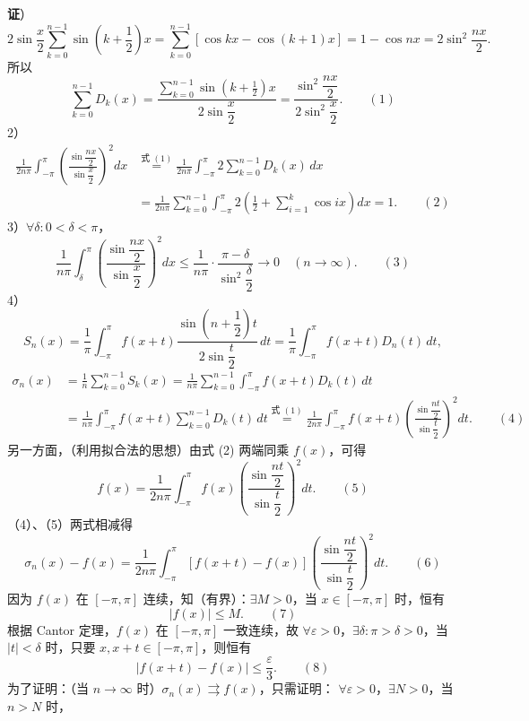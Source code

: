 \documentclass[UTF8,12pt,a4paper,fontset=fandol]{ctexart}
\providecommand{\xlongequal}[1]{\stackrel{#1}{=}}
\begin{document}
\noindent\textbf{证}）
\[
  2\sin\frac x2\sum_{k=0}^{n-1}\sin\left(k+\frac12\right)x
  =\sum_{k=0}^{n-1}[\cos kx-\cos(k+1)x]
  =1-\cos nx=2\sin^2\frac{nx}{2}.
\]
所以
\[
  \sum_{k=0}^{n-1}D_k(x)
  =\frac{\displaystyle\sum_{k=0}^{n-1}\sin\left(k+\frac12\right)x}{2\sin\dfrac x2}
  =\frac{\sin^2\dfrac{nx}{2}}{2\sin^2\dfrac x2}. \qquad(1)
\]
2）
\[
\begin{aligned}
\frac1{2n\pi}\int_{-\pi}^{\pi}
\left(\frac{\sin\dfrac{nx}{2}}{\sin\dfrac x2}\right)^2dx
&\xlongequal{\text{式 }(1)}
\frac1{2n\pi}\int_{-\pi}^{\pi}2\sum_{k=0}^{n-1}D_k(x)\,dx\\
&=\frac1{2n\pi}\sum_{k=0}^{n-1}\int_{-\pi}^{\pi}2\left(\frac12+\sum_{i=1}^{k}\cos ix\right)dx=1. \qquad(2)
\end{aligned}
\]
3）$\forall\delta:0<\delta<\pi$，
\[
  \frac1{n\pi}\int_{\delta}^{\pi}
  \left(\frac{\sin\dfrac{nx}{2}}{\sin\dfrac x2}\right)^2dx
  \le\frac1{n\pi}\cdot\frac{\pi-\delta}{\sin^2\dfrac{\delta}{2}}\to0
  \quad(n\to\infty). \qquad(3)
\]
4）
\[
  S_n(x)=\frac1\pi\int_{-\pi}^{\pi}f(x+t)
  \frac{\sin\left(n+\dfrac12\right)t}{2\sin\dfrac t2}\,dt
  =\frac1\pi\int_{-\pi}^{\pi}f(x+t)D_n(t)\,dt,
\]
\[
\begin{aligned}
\sigma_n(x)&=\frac1n\sum_{k=0}^{n-1}S_k(x)
=\frac1{n\pi}\sum_{k=0}^{n-1}\int_{-\pi}^{\pi}f(x+t)D_k(t)\,dt\\
&=\frac1{n\pi}\int_{-\pi}^{\pi}f(x+t)\sum_{k=0}^{n-1}D_k(t)\,dt
\xlongequal{\text{式 }(1)}
\frac1{2n\pi}\int_{-\pi}^{\pi}f(x+t)
\left(\frac{\sin\dfrac{nt}{2}}{\sin\dfrac t2}\right)^2dt. \qquad(4)
\end{aligned}
\]
另一方面，（利用拟合法的思想）由式 (2) 两端同乘 $f(x)$，可得
\[
  f(x)=\frac1{2n\pi}\int_{-\pi}^{\pi}f(x)
  \left(\frac{\sin\dfrac{nt}{2}}{\sin\dfrac t2}\right)^2dt. \qquad(5)
\]
（4）、（5）两式相减得
\[
  \sigma_n(x)-f(x)=\frac1{2n\pi}\int_{-\pi}^{\pi}
  [f(x+t)-f(x)]
  \left(\frac{\sin\dfrac{nt}{2}}{\sin\dfrac t2}\right)^2dt. \qquad(6)
\]
因为 $f(x)$ 在 $[-\pi,\pi]$ 连续，知（有界）：$\exists M>0$，当 $x\in[-\pi,\pi]$ 时，恒有
\[
  |f(x)|\le M. \qquad(7)
\]
根据 Cantor 定理，$f(x)$ 在 $[-\pi,\pi]$ 一致连续，故 $\forall\varepsilon>0$，$\exists\delta:\pi>\delta>0$，当
$|t|<\delta$ 时，只要 $x,x+t\in[-\pi,\pi]$，则恒有
\[
  |f(x+t)-f(x)|\le\frac{\varepsilon}{3}. \qquad(8)
\]
为了证明：（当 $n\to\infty$ 时）$\sigma_n(x)\rightrightarrows f(x)$，只需证明：
$\forall\varepsilon>0$，$\exists N>0$，当 $n>N$ 时，
\end{document}

